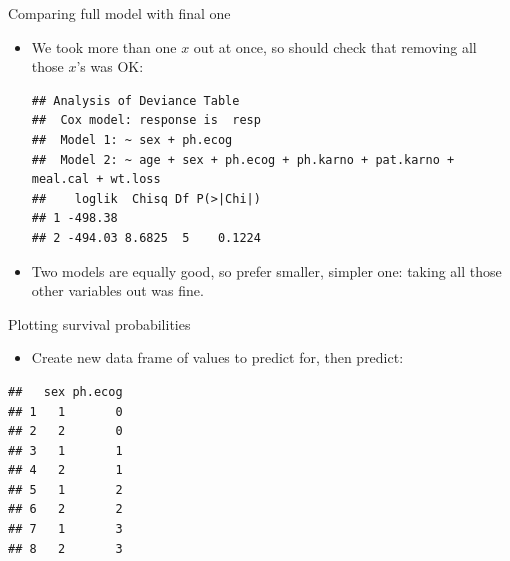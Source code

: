 \begin{frame}[fragile]{Comparing full model with final one}
  
  \begin{itemize}
  \item We took more than one $x$ out at once, so should check that
    removing all those $x$'s was OK:
    
\begin{knitrout}
\color{fgcolor}\begin{kframe}
\begin{alltt}
\end{alltt}
\begin{verbatim}
## Analysis of Deviance Table
##  Cox model: response is  resp
##  Model 1: ~ sex + ph.ecog
##  Model 2: ~ age + sex + ph.ecog + ph.karno + pat.karno + meal.cal + wt.loss
##    loglik  Chisq Df P(>|Chi|)
## 1 -498.38                    
## 2 -494.03 8.6825  5    0.1224
\end{verbatim}
\end{kframe}
\end{knitrout}
\item Two models are equally good, so prefer smaller, simpler one:
  taking all those other variables out was fine.
  \end{itemize}
  
\end{frame}

\begin{frame}[fragile]{Plotting survival probabilities}

  \begin{itemize}
  \item Create new data frame of values to predict for, then predict:
  \end{itemize}

{\footnotesize
  
 
\begin{knitrout}
\color{fgcolor}\begin{kframe}
\begin{alltt}
\hlkwb{=}\hlstd{(}\hlstd{=}\hlstd{(}\hlstd{,}\hlstd{),}\hlstd{=}\hlopt{:}\hlstd{)}
\end{alltt}
\begin{verbatim}
##   sex ph.ecog
## 1   1       0
## 2   2       0
## 3   1       1
## 4   2       1
## 5   1       2
## 6   2       2
## 7   1       3
## 8   2       3
\end{verbatim}
\begin{alltt}
\hlkwb{=}
\end{alltt}
\end{kframe}
\end{knitrout}
  
}
 
\end{frame}


